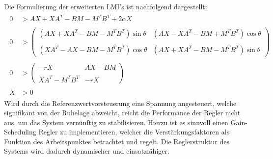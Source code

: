 {Die Formulierung der erweiterten LMI's ist nachfolgend dargestellt:\\
\begin{align*}
    \begin{split}
        0 &> AX + XA^T - BM -M^TB^T + 2\alpha X\\\\
        0 &>
        \begin{pmatrix}
            (AX + XA^T - BM - M^TB^T)\sin\theta & (AX - XA^T - BM + M^TB^T)\cos\theta \\\\
            (XA^T - AX - BM - M^TB^T)\cos\theta & (AX + XA^T - BM - M^TB^T)\sin\theta
        \end{pmatrix}\\\\
        0 &> 
        \begin{pmatrix}
            -rX & AX - B M \\\\
            XA^T - M^TB^T & -rX
        \end{pmatrix} \\\\
        X &> 0
    \end{split}
\end{align*}
\newline
Wird durch die Referenzwertvorsteuerung eine Spannung angesteuert, welche signifikant von der Ruhelage abweicht, reicht die Performance der Regler nicht aus, um das System vernünftig zu stabilisieren. Hierzu ist es sinnvoll einen Gain-Scheduling Regler zu implementieren, welcher die Verstärkungsfaktoren als Funktion des Arbeitspunktes betrachtet und regelt. Die Reglerstruktur des Systems wird dadurch dynamischer und einsatzfähiger.
}
